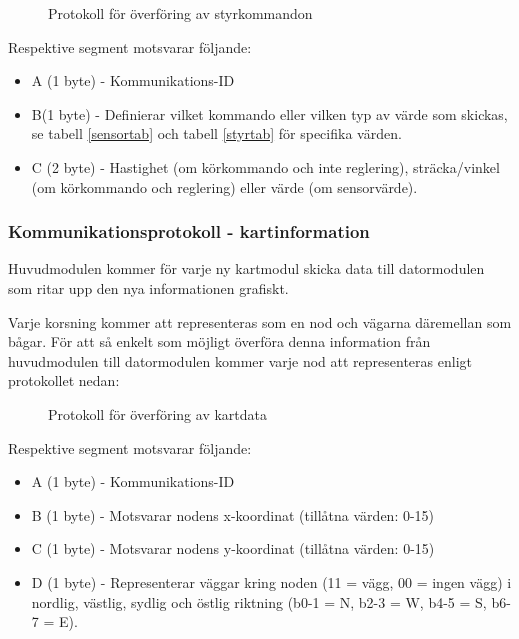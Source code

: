 \documentclass[11pt]{article}
\begin{document}
\begin{flushleft}
\begin{figure}[htbp]
\centering
\noindent\resizebox{.8\linewidth}{!}{
	}
	\caption{Protokoll för överföring av styrkommandon\label{styrdata}}	
\end{figure}

Respektive segment motsvarar följande: 
\begin{itemize}
	\item A (1 byte) - Kommunikations-ID
	\item B(1 byte) - Definierar vilket kommando eller vilken typ av värde som skickas, se tabell \ref{sensortab} och tabell \ref{styrtab} för specifika värden.
	\item C (2 byte) - Hastighet (om körkommando och inte reglering), sträcka/vinkel (om körkommando och reglering) eller värde (om sensorvärde).
\end{itemize}

\subsubsection{Kommunikationsprotokoll - kartinformation}
Huvudmodulen kommer för varje ny kartmodul skicka data till datormodulen som ritar upp den nya informationen grafiskt. 

Varje korsning kommer att representeras som en nod och vägarna däremellan som bågar. För att så enkelt som möjligt överföra denna information från huvudmodulen till datormodulen kommer varje nod att representeras enligt protokollet nedan:

 \begin{figure}[H]
\centering
\noindent\resizebox{.8\linewidth}{!}{
	}
	\caption{Protokoll för överföring av kartdata \label{kartdata}}	
\end{figure} 

Respektive segment motsvarar följande: 
\begin{itemize}
	\item A (1 byte) - Kommunikations-ID
	\item B (1 byte) - Motsvarar nodens x-koordinat (tillåtna värden: 0-15)
	\item C (1 byte) - Motsvarar nodens y-koordinat (tillåtna värden: 0-15)
	\item D (1 byte) - Representerar väggar kring noden (11 = vägg, 00 = ingen vägg) i nordlig, västlig, sydlig och östlig riktning (b0-1 = N, b2-3 = W, b4-5 = S, b6-7 = E).
\end{itemize}


\end{flushleft}
\end{document}
